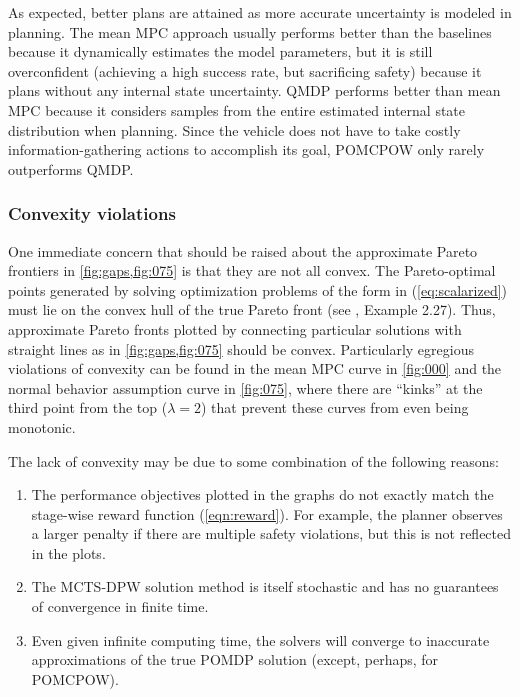 As expected, better plans are attained as more accurate uncertainty is modeled in planning.
The mean MPC approach usually performs better than the baselines because it dynamically estimates the model parameters, but it is still overconfident (achieving a high success rate, but sacrificing safety) because it plans without any internal state uncertainty. 
QMDP performs better than mean MPC because it considers samples from the entire estimated internal state distribution when planning.
Since the vehicle does not have to take costly information-gathering actions to accomplish its goal, POMCPOW only rarely outperforms QMDP.

\subsubsection{Convexity violations}

One immediate concern that should be raised about the approximate Pareto frontiers in \cref{fig:gaps,fig:075} is that they are not all convex.
The Pareto-optimal points generated by solving optimization problems of the form in (\ref{eq:scalarized}) must lie on the convex hull of the true Pareto front (see \citet{boyd2004convex}, Example 2.27).
Thus, approximate Pareto fronts plotted by connecting particular solutions with straight lines as in \cref{fig:gaps,fig:075} should be convex.
Particularly egregious violations of convexity can be found in the mean MPC curve in \cref{fig:000} and the normal behavior assumption curve in \cref{fig:075}, where there are ``kinks'' at the third point from the top ($\lambda=2$) that prevent these curves from even being monotonic.

The lack of convexity may be due to some combination of the following reasons:%
\begin{enumerate}
    \item The performance objectives plotted in the graphs do not exactly match the stage-wise reward function (\ref{eqn:reward}). For example, the planner observes a larger penalty if there are multiple safety violations, but this is not reflected in the plots.
    \item The MCTS-DPW solution method is itself stochastic and has no guarantees of convergence in finite time.
    \item Even given infinite computing time, the solvers will converge to inaccurate approximations of the true POMDP solution (except, perhaps, for POMCPOW).
\end{enumerate}

